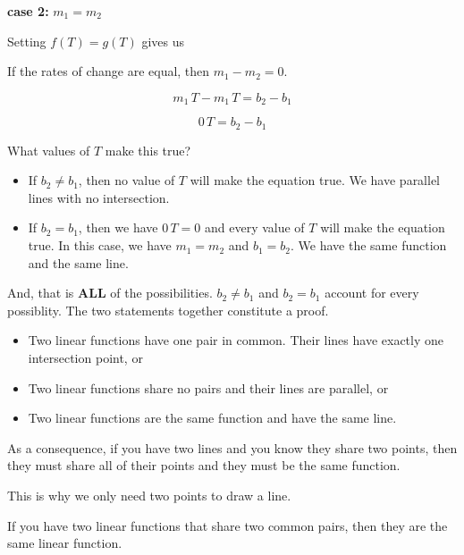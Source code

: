 \documentclass{ximera}
\begin{document}
\begin{explanation}
\textbf{case 2:}  $m_1 = m_2$ 



Setting $f(T) = g(T)$ gives us 

If the rates of change are equal, then  $m_1 - m_2 = 0$.

\[     m_1 \, T - m_1 \, T =  b_2 - b_1 \]


\[     0 \, T =  b_2 - b_1 \]


What values of $T$ make this true?


\begin{itemize}
\item If $b_2 \ne b_1$, then no value of $T$ will make the equation true.  We have parallel lines with no intersection.

\item If $b_2 = b_1$, then we have $0 \, T =  0$ and every value of $T$ will make the equation true.  In this case, we have $m_1 = m_2$ and $b_1 = b_2$.  We have the same function and the same line.
\end{itemize}



And, that is \textbf{\textcolor{purple!85!blue}{ALL}} of the possibilities.  $b_2 \ne b_1$ and  $b_2 = b_1$ account for every possiblity.  The two statements together constitute a proof.


\begin{itemize}
\item Two linear functions have one pair in common. Their lines have exactly one intersection point, or

\item Two linear functions share no pairs and their lines are parallel, or

\item Two linear functions are the same function and have the same line.



\end{itemize}





\end{explanation}


As a consequence, if you have two lines and you know they share two points, then they must share all of their points and they must be the same function.   

This is why we only need two points to draw a line.


If you have two linear functions that share two common pairs, then they are the same linear function.
\end{document}
